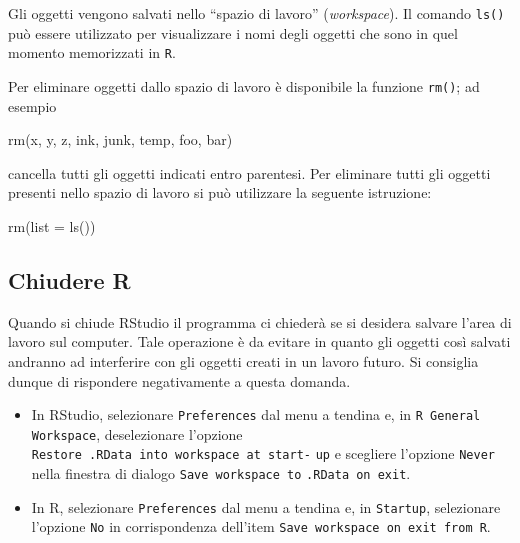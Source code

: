 \documentclass[
]{memoir}
\newenvironment{Shaded}{\begin{snugshade}}{\end{snugshade}}
\newcommand{\AttributeTok}[1]{\textcolor[rgb]{0.77,0.63,0.00}{#1}}
\newcommand{\FunctionTok}[1]{\textcolor[rgb]{0.00,0.00,0.00}{#1}}
\newcommand{\NormalTok}[1]{#1}
\theoremstyle{definition}
\theoremstyle{definition}
\theoremstyle{definition}
\theoremstyle{definition}
\theoremstyle{remark}
\begin{document}
Gli oggetti vengono salvati nello ``spazio di lavoro'' (\emph{workspace}). Il
comando \texttt{ls()} può essere utilizzato per visualizzare i nomi degli
oggetti che sono in quel momento memorizzati in \texttt{R}.

Per eliminare oggetti dallo spazio di lavoro è disponibile la funzione
\texttt{rm()}; ad esempio

\begin{Shaded}
\begin{Highlighting}[]
\FunctionTok{rm}\NormalTok{(x, y, z, ink, junk, temp, foo, bar)}
\end{Highlighting}
\end{Shaded}

cancella tutti gli oggetti indicati entro parentesi. Per eliminare tutti
gli oggetti presenti nello spazio di lavoro si può utilizzare la
seguente istruzione:

\begin{Shaded}
\begin{Highlighting}[]
\FunctionTok{rm}\NormalTok{(}\AttributeTok{list =} \FunctionTok{ls}\NormalTok{())}
\end{Highlighting}
\end{Shaded}

\hypertarget{chiudere-r}{%
\subsection{Chiudere R}\label{chiudere-r}}

Quando si chiude RStudio il programma ci chiederà se si desidera salvare
l'area di lavoro sul computer. Tale operazione è da evitare in quanto
gli oggetti così salvati andranno ad interferire con gli oggetti creati
in un lavoro futuro. Si consiglia dunque di rispondere negativamente a
questa domanda.

\begin{itemize}
\item
  In RStudio, selezionare \texttt{Preferences} dal menu a tendina e, in
  \texttt{R\ General} \texttt{Workspace}, deselezionare l'opzione
  \texttt{Restore\ .RData\ into\ workspace\ at\ start-} \texttt{up} e scegliere l'opzione
  \texttt{Never} nella finestra di dialogo \texttt{Save\ workspace\ to}
  \texttt{.RData\ on\ exit}.
\item
  In R, selezionare \texttt{Preferences} dal menu a tendina e, in \texttt{Startup},
  selezionare l'opzione \texttt{No} in corrispondenza dell'item
  \texttt{Save\ workspace\ on\ exit\ from\ R}.
\end{itemize}
\end{document}
